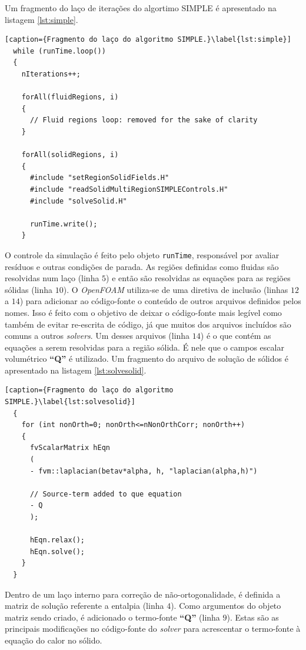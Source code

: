 Um fragmento do laço de iterações do algortimo SIMPLE é apresentado na listagem \ref{lst:simple}.

\begin{lstlisting}[caption={Fragmento do laço do algoritmo SIMPLE.}\label{lst:simple}]
  while (runTime.loop())
  {
    nIterations++;

    forAll(fluidRegions, i)
    {
      // Fluid regions loop: removed for the sake of clarity
    }
    
    forAll(solidRegions, i)
    {
      #include "setRegionSolidFields.H"
      #include "readSolidMultiRegionSIMPLEControls.H"
      #include "solveSolid.H"
      
      runTime.write();
    }
\end{lstlisting}

O controle da simulação é feito pelo objeto \texttt{runTime}, responsável por avaliar resíduos
e outras condições de parada. As regiões definidas como fluidas são resolvidas num laço (linha $5$)
e então são resolvidas as equações para as regiões sólidas (linha $10$). O \textit{OpenFOAM} utiliza-se
de uma diretiva de inclusão (linhas $12$ a $14$) para adicionar ao código-fonte o conteúdo de outros
arquivos definidos pelos nomes. Isso é feito com o objetivo de deixar o código-fonte mais legível como
também de evitar re-escrita de código, já que muitos dos arquivos incluídos são comuns a outros
\textit{solvers}. Um desses arquivos (linha $14$) é o que contém as equações a serem resolvidas para
a região sólida. É nele que o campos escalar volumétrico \textbf{``Q''} é utilizado. Um fragmento
do arquivo de solução de sólidos é apresentado na listagem \ref{lst:solvesolid}.

\begin{lstlisting}[caption={Fragmento do laço do algoritmo SIMPLE.}\label{lst:solvesolid}]
  {
    for (int nonOrth=0; nonOrth<=nNonOrthCorr; nonOrth++)
    {
      fvScalarMatrix hEqn
      (
      - fvm::laplacian(betav*alpha, h, "laplacian(alpha,h)")

      // Source-term added to que equation
      - Q
      );

      hEqn.relax();
      hEqn.solve();
    }
  }
\end{lstlisting}

Dentro de um laço interno para correção de não-ortogonalidade, é definida a matriz de solução
referente a entalpia (linha $4$). Como argumentos do objeto matriz sendo criado, é adicionado
o termo-fonte \textbf{``Q''} (linha $9$). Estas são as principais
modificações no código-fonte do \textit{solver} para
acrescentar o termo-fonte à equação do calor no sólido.

